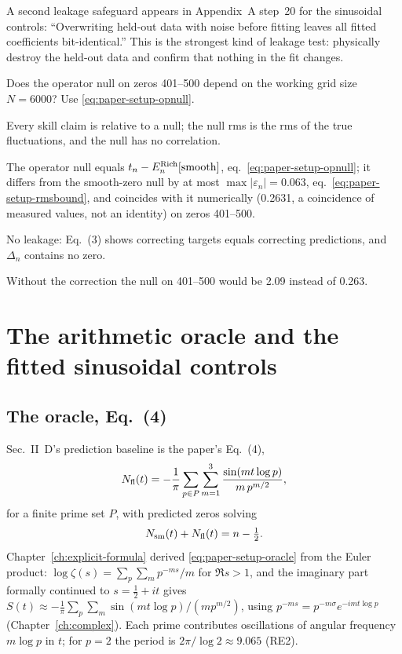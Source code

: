 A second leakage safeguard appears in Appendix~A step~20 for the sinusoidal controls: ``Overwriting held-out data with noise before fitting leaves all fitted coefficients bit-identical.'' This is the strongest kind of leakage test: physically destroy the held-out data and confirm that nothing in the fit changes.

\begin{checkpoint}
Does the operator null on zeros 401--500 depend on the working grid size $N=6000$? Use \eqref{eq:paper-setup-opnull}.
\end{checkpoint}

\begin{keyideas}
\item Every skill claim is relative to a null; the null rms is the rms of the true fluctuations, and the null has no correlation.
\item The operator null equals $t_n-E^{\rm Rich}_n[\text{smooth}]$, eq.~\eqref{eq:paper-setup-opnull}; it differs from the smooth-zero null by at most $\max|\varepsilon_n|=0.063$, eq.~\eqref{eq:paper-setup-rmsbound}, and coincides with it numerically (0.2631, a coincidence of measured values, not an identity) on zeros 401--500.
\item No leakage: Eq.~(3) shows correcting targets equals correcting predictions, and $\Delta_n$ contains no zero.
\item Without the correction the null on 401--500 would be 2.09 instead of 0.263.
\end{keyideas}

\section{The arithmetic oracle and the fitted sinusoidal controls}\label{sec:paper-setup-oracle}

\subsection{The oracle, Eq.~(4)}

Sec.~II~D's prediction baseline is the paper's Eq.~(4),
\begin{equation}
N_{\mathrm{fl}}(t)=-\frac1\pi\sum_{p\in P}\sum_{m=1}^{3}\frac{\sin(mt\log p)}{m\,p^{m/2}},
\label{eq:paper-setup-oracle}
\end{equation}
for a finite prime set $P$, with predicted zeros solving
\begin{equation}
N_{\mathrm{sm}}(t)+N_{\mathrm{fl}}(t)=n-\tfrac12 .
\label{eq:paper-setup-level}
\end{equation}
Chapter~\ref{ch:explicit-formula} derived \eqref{eq:paper-setup-oracle} from the Euler product: $\log\zeta(s)=\sum_p\sum_m p^{-ms}/m$ for $\Re s>1$, and the imaginary part formally continued to $s=\tfrac12+it$ gives $S(t)\approx-\frac1\pi\sum_p\sum_m\sin(mt\log p)/(mp^{m/2})$, using $p^{-ms}=p^{-m\sigma}e^{-imt\log p}$ (Chapter~\ref{ch:complex}). Each prime contributes oscillations of angular frequency $m\log p$ in $t$; for $p=2$ the period is $2\pi/\log2\approx9.065$ (RE2).

